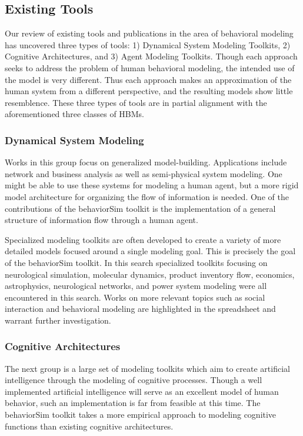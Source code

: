 \documentclass[conference]{IEEEtran}
\begin{document}
\subsection{Existing Tools}
Our review of existing tools and publications in the area of behavioral modeling has uncovered three types of tools: 1) Dynamical System Modeling Toolkits, 2) Cognitive Architectures, and 3) Agent Modeling Toolkits. 
Though each approach seeks to address the problem of human behavioral modeling, the intended use of the model is very different. 
Thus each approach makes an approximation of the human system from a different perspective, and the resulting models show little resemblence.
These three types of tools are in partial alignment with the aforementioned three classes of HBMs.

\subsubsection{Dynamical System Modeling}
Works in this group focus on generalized model-building. 
Applications include network and business analysis as well as semi-physical system modeling. 
One might be able to use these systems for modeling a human agent, but a more rigid model architecture for organizing the flow of information is needed. 
One of the contributions of the behaviorSim toolkit is the implementation of a general structure of information flow through a human agent.

Specialized modeling toolkits are often developed to create a variety of more detailed models focused around a single modeling goal. 
This is precisely the goal of the behaviorSim toolkit. 
In this search specialized toolkits focusing on neurological simulation, molecular dynamics, product inventory flow, economics, astrophysics, neurological networks, and power system modeling were all encountered in this search. 
Works on more relevant topics such as social interaction and behavioral modeling are highlighted in the spreadsheet and warrant further investigation.

\subsubsection{Cognitive Architectures}
The next group is a large set of modeling toolkits which aim to create artificial intelligence through the modeling of cognitive processes. 
Though a well implemented artificial intelligence will serve as an excellent model of human behavior, such an implementation is far from feasible at this time. 
The behaviorSim toolkit takes a more empirical approach to modeling cognitive functions than existing cognitive architectures.
\end{document}
